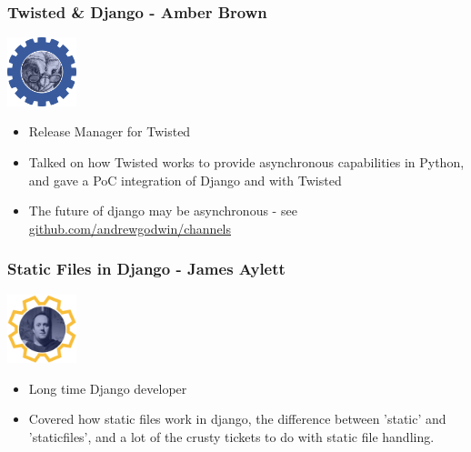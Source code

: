 \documentclass{beamer}
\begin{document}
\begin{frame}[fragile]\frametitle{Twisted \& Django - Amber Brown}

    \begin{center}
        \includegraphics[width=2cm]{speaker-amber}
    \end{center}

    \begin{itemize}
        \item Release Manager for Twisted
        \item Talked on how Twisted works to provide asynchronous capabilities in Python, and gave a PoC integration of Django and with Twisted
        \item The future of django may be asynchronous - see \url{github.com/andrewgodwin/channels}
    \end{itemize}

\end{frame}


\begin{frame}[fragile]\frametitle{Static Files in Django - James Aylett}

    \begin{center}
        \includegraphics[width=2cm]{speaker-james}
    \end{center}

    \begin{itemize}
        \item Long time Django developer
        \item Covered how static files work in django, the difference between 'static' and 'staticfiles', and a lot of the crusty tickets to do with static file handling.
    \end{itemize}

\end{frame}
\end{document}
